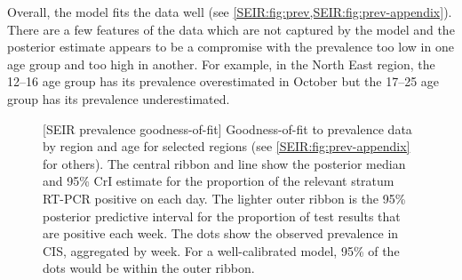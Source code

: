 \documentclass[thesis.tex]{subfiles}
\begin{document}
Overall, the model fits the data well (see \cref{SEIR:fig:prev,SEIR:fig:prev-appendix}).
There are a few features of the data which are not captured by the model and the posterior estimate appears to be a compromise with the prevalence too low in one age group and too high in another.
For example, in the North East region, the 12--16 age group has its prevalence overestimated in October but the 17--25 age group has its prevalence underestimated.
\begin{figure}
    \captionsetup{width=0.8\paperwidth}
    [SEIR prevalence goodness-of-fit]{%
        Goodness-of-fit to prevalence data by region and age for selected regions (see \cref{SEIR:fig:prev-appendix} for others).
        The central ribbon and line show the posterior median and 95\% CrI estimate for the proportion of the relevant stratum RT-PCR positive on each day.
        The lighter outer ribbon is the 95\% posterior predictive interval for the proportion of test results that are positive each week.
        The dots show the observed prevalence in CIS, aggregated by week.
        For a well-calibrated model, 95\% of the dots would be within the outer ribbon.
    }
    \label{SEIR:fig:prev}
\end{figure}
\end{document}
